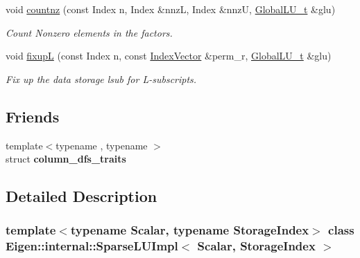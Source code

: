\begin{DoxyCompactItemize}
\mbox{\label{class_eigen_1_1internal_1_1_sparse_l_u_impl_acbede3f259186d48ad42ca093f80b64b}} 
void \mbox{\hyperlink{class_eigen_1_1internal_1_1_sparse_l_u_impl_acbede3f259186d48ad42ca093f80b64b}{countnz}} (const Index n, Index \&nnzL, Index \&nnzU, \mbox{\hyperlink{struct_eigen_1_1internal_1_1_l_u___global_l_u__t}{Global\+L\+U\+\_\+t}} \&glu)
\begin{DoxyCompactList}\small\item\em Count Nonzero elements in the factors. \end{DoxyCompactList}\item 
void \mbox{\hyperlink{class_eigen_1_1internal_1_1_sparse_l_u_impl_ae1d1ed091956ff4e5734b4e3f79f866e}{fixupL}} (const Index n, const \mbox{\hyperlink{class_eigen_1_1_matrix}{Index\+Vector}} \&perm\+\_\+r, \mbox{\hyperlink{struct_eigen_1_1internal_1_1_l_u___global_l_u__t}{Global\+L\+U\+\_\+t}} \&glu)
\begin{DoxyCompactList}\small\item\em Fix up the data storage lsub for L-\/subscripts. \end{DoxyCompactList}\end{DoxyCompactItemize}
\subsection*{Friends}
\begin{DoxyCompactItemize}
\item 
\mbox{\label{class_eigen_1_1internal_1_1_sparse_l_u_impl_aeb52445d9b5f3ca9a6e74be2e7e42e12}} 
{\footnotesize template$<$typename , typename $>$ }\\struct {\bfseries column\+\_\+dfs\+\_\+traits}
\end{DoxyCompactItemize}


\subsection{Detailed Description}
\subsubsection*{template$<$typename Scalar, typename Storage\+Index$>$\newline
class Eigen\+::internal\+::\+Sparse\+L\+U\+Impl$<$ Scalar, Storage\+Index $>$}


